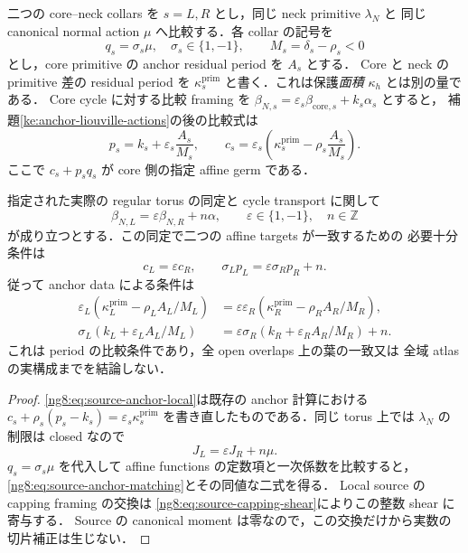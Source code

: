 \begin{proposition}
\label{ng8:source-corrected-anchor-matching}
二つの core--neck collars を $s=L,R$ とし，同じ neck primitive $\lambda_N$ と
同じ canonical normal action $\mu$ へ比較する．各 collar の記号を
\[
 q_s=\sigma_s\mu,\quad \sigma_s\in\{1,-1\},\qquad
 M_s=\delta_s-\rho_s<0
\]
とし，core primitive の anchor residual period を $A_s$ とする．
Core と neck の primitive 差の residual period を
$\kappa_s^{\mathrm{prim}}$ と書く．これは保護\emph{面積} $\kappa_h$ とは別の量である．
Core cycle に対する比較 framing を
$\beta_{N,s}=\varepsilon_s\beta_{\mathrm{core},s}+k_s\alpha_s$ とすると，
補題\ref{ke:anchor-liouville-actions}の後の比較式は
\begin{equation}\label{ng8:eq:source-anchor-local}
 p_s=k_s+\varepsilon_s\frac{A_s}{M_s},\qquad
 c_s=\varepsilon_s\left(\kappa_s^{\mathrm{prim}}
                              -\rho_s\frac{A_s}{M_s}\right).
\end{equation}
ここで $c_s+p_sq_s$ が core 側の指定 affine germ である．

指定された実際の regular torus の同定と cycle transport に関して
\[
 \beta_{N,L}=\varepsilon\beta_{N,R}+n\alpha,
 \qquad \varepsilon\in\{1,-1\},\quad n\in\mathbb Z
\]
が成り立つとする．この同定で二つの affine targets が一致するための
必要十分条件は
\begin{equation}\label{ng8:eq:source-anchor-matching}
 c_L=\varepsilon c_R,
 \qquad \sigma_Lp_L=\varepsilon\sigma_Rp_R+n .
\end{equation}
従って anchor data による条件は
\begin{align*}
 \varepsilon_L\left(\kappa_L^{\mathrm{prim}}-\rho_L A_L/M_L\right)
 &=\varepsilon\varepsilon_R
   \left(\kappa_R^{\mathrm{prim}}-\rho_R A_R/M_R\right),\\
 \sigma_L\left(k_L+\varepsilon_L A_L/M_L\right)
 &=\varepsilon\sigma_R\left(k_R+\varepsilon_R A_R/M_R\right)+n .
\end{align*}
これは period の比較条件であり，全 open overlaps 上の葉の一致又は
全域 atlas の実構成までを結論しない．
\end{proposition}

\begin{proof}
\eqref{ng8:eq:source-anchor-local}は既存の anchor 計算における
$c_s+\rho_s(p_s-k_s)=\varepsilon_s\kappa_s^{\mathrm{prim}}$
を書き直したものである．同じ torus 上では $\lambda_N$ の制限は closed なので
\[
 J_L=\varepsilon J_R+n\mu .
\]
$q_s=\sigma_s\mu$ を代入して affine functions の定数項と一次係数を比較すると，
\eqref{ng8:eq:source-anchor-matching}とその同値な二式を得る．
Local source の capping framing の交換は
\eqref{ng8:eq:source-capping-shear}によりこの整数 shear に寄与する．
Source の canonical moment は零なので，この交換だけから実数の切片補正は生じない．
\end{proof}


